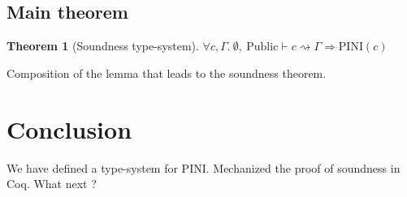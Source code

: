 \documentclass[10pt]{article}
\newcommand{\ctx}{\Gamma}
\newcommand{\typing}[4]{ #1,~#2 \vdash #3 \rightsquigarrow #4}
\newcommand{\pini}[1]{\mathrm{PINI}(#1)}
\newtheorem{theorem}{Theorem}
\begin{document}
\subsection{Main theorem}%
\label{subsec:main_theorem}

\begin{theorem}[Soundness type-system]
  \( \forall c, \ctx.\
  \typing{\emptyset}{\mathrm{Public}}{c}{\ctx}
  \Rightarrow \pini{c}
  \)
\end{theorem}

Composition of the lemma that leads to the soundness theorem.

\section{Conclusion}%
\label{sec:conclusion}

We have defined a type-system for PINI. Mechanized the proof of soundness in Coq.
What next ?




\end{document}
